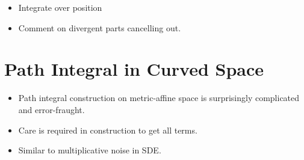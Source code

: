 \begin{itemize}

  \item {Integrate over position}
  \item Comment on divergent parts cancelling out. 
\end{itemize}

\section{Path Integral in Curved Space}

\begin{itemize}
  \item Path integral construction on metric-affine space is surprisingly complicated 
    and error-fraught.  
  \item Care is required in construction to get all terms.  
  \item Similar to multiplicative noise in SDE.
\end{itemize}

